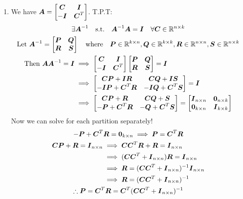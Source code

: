 \documentclass[]{exam}
\begin{document}
\begin{questions}
\begin{enumerate}[label=\arabic*.]
	\item We have $\mA = \bmat{\mC & \mI \\ -\mI & \mC^T}$. T.P.T:
		\begin{gather*}
			\exists \mA^{-1} \quad \mathrm{s.t.} \quad \mA^{-1} \mA = \mI \quad \forall \mC \in \mathbb{R}^{n \times k} \\
			\mathrm{Let~} \mA^{-1} = \bmat{\mP & \mQ \\ \mR & \mS} \quad \mathrm{where} \quad \mP \in \mathbb{R}^{k \times n}, \mQ \in \mathbb{R}^{k \times k}, \mR \in \mathbb{R}^{n \times n}, \mS \in \mathbb{R}^{n \times k} \\
			\begin{aligned}
				\mathrm{Then~} \mA \mA^{-1} = \mI &\implies \bmat{\mC & \mI \\ -\mI & \mC^T} \bmat{\mP & \mQ \\ \mR & \mS} = \mI \\
				&\implies \bmat{\mC \mP + \mI \mR & \mC \mQ + \mI \mS \\ -\mI \mP + \mC^T \mR & -\mI \mQ + \mC^T \mS} =  \mI \\
				&\implies \bmat{\mC \mP + \mR & \mC \mQ + \mS \\ - \mP + \mC^T \mR & -\mQ + \mC^T \mS} = \bmat{\mI_{n \times n} & \mathbf{0}_{n \times k} \\ \mathbf{0}_{k \times n} & \mI_{k \times k}} \\
			\end{aligned}
		\end{gather*}
		Now we can solve for each partition separately!
		\begin{gather*}
			-\mP + \mC^T \mR = \mathbf{0}_{k \times n} \implies \mP = \mC^T \mR \\
			\begin{aligned}
				\mC \mP + \mR = \mI_{n \times n} &\implies \mC \mC^T \mR + \mR = \mI_{n \times n} \\
				&\implies (\mC \mC^T + \mI_{n \times n}) \mR = \mI_{n \times n} \\
				&\implies \mR = (\mC \mC^T + \mI_{n \times n})^{-1} \mI_{n \times n} \\
				&\implies \mR = (\mC \mC^T + \mI_{n \times n})^{-1}
			\end{aligned} \\
			\therefore \mP = \mC^T \mR = \mC^T (\mC \mC^T + \mI_{n \times n})^{-1} \\ \\

\end{gather*}
\end{enumerate}
\end{questions}
\end{document}
